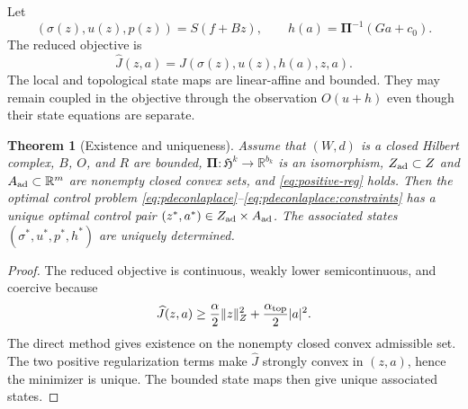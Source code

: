 \documentclass{article}
\newtheorem{theorem}{Theorem}[section]
\newcommand{\R} {\mathbb R}
\newcommand{\HH}{\mathfrak H}
\newcommand{\Piop}{\boldsymbol\Pi}
\newcommand{\norm}[1]{\lVert #1\rVert}
\begin{document}

Let
\[
(\sigma(z),u(z),p(z))=S(f+Bz),\qquad h(a)=\Piop^{-1}(Ga+c_0).
\]
The reduced objective is
\begin{equation}
 \widehat J(z,a)=J(\sigma(z),u(z),h(a),z,a).
\end{equation}
The local and topological state maps are linear-affine and bounded. They may remain coupled in the objective through the observation $O(u+h)$ even though their state equations are separate.

\begin{theorem}[Existence and uniqueness]\label{thm:existence}
Assume that $(W,d)$ is a closed Hilbert complex, $B$, $O$, and $R$ are
bounded, $\Piop:\HH^k\to\R^{b_k}$ is an isomorphism, $Z_{\rm ad}\subset Z$
and $A_{\rm ad}\subset\R^m$ are nonempty closed convex sets, and
\eqref{eq:positive-reg} holds. Then the optimal control problem
\eqref{eq:pdeconlaplace}--\eqref{eq:pdeconlaplace:constraints}
has a unique optimal control pair
$(z^*,a^*)\in Z_{\rm ad}\times A_{\rm ad}$.
The associated states $(\sigma^*,u^*,p^*,h^*)$ are uniquely determined.
\end{theorem}

\begin{proof}
The reduced objective is continuous, weakly lower semicontinuous, and coercive because
\[
 \widehat J(z,a)\ge \frac{\alpha}{2}\norm{z}_Z^2+\frac{\alpha_{\rm top}}{2}|a|^2.
\]
The direct method gives existence on the nonempty closed convex admissible set. The two positive regularization terms make $\widehat J$ strongly convex in $(z,a)$, hence the minimizer is unique. The bounded state maps then give unique associated states.
\end{proof}
\end{document}
